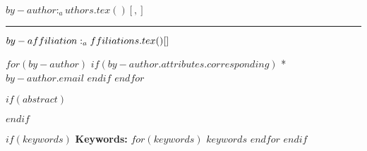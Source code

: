 
\maketitle

\begin{center}

\thispagestyle{fancy}


$by-author:_authors.tex()[, ]$\vspace{12pt}

\rule{\textwidth}{1.8pt}\vspace{8pt}

\end{center}

$by-affiliation:_affiliations.tex()[\\ ]$

$for(by-author)$
$if(by-author.attributes.corresponding)$
* \small{$by-author.email$}
$endif$
$endfor$

\vspace{12pt}

$if(abstract)$
\begin{abstract}
$abstract$
\end{abstract}
$endif$

$if(keywords)$
\small \textbf{Keywords:} $for(keywords)$ $keywords$ $endfor$ $endif$ \\

\vfill

